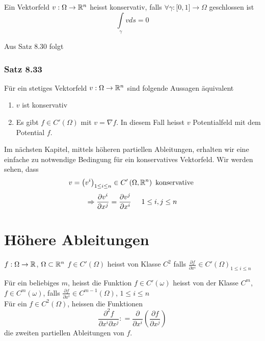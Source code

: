 \begin{definition}{8.32}
Ein Vektorfeld $v:\Omega\to\mathbb{R}^n$ heisst konservativ, falls $\forall\gamma:\lbrack 0,1\rbrack\to\Omega$ geschlossen ist \[\int\limits_\gamma v ds=0\]
\end{definition}
Aus Satz 8.30 folgt
\subsubsection*{Satz 8.33}
Für ein stetiges Vektorfeld $v:\Omega\to\mathbb{R}^n$ sind folgende Aussagen äquivalent
\begin{enumerate}
\item $v$ ist konservativ
\item Es gibt $f\in C'\left( \Omega\right)$ mit $v=\nabla f$. In diesem Fall heisst $v$ Potentialfeld mit dem Potential $f$.
\end{enumerate}

Im nächsten Kapitel, mittels höheren partiellen Ableitungen, erhalten wir eine einfache zu  notwendige Bedingung für ein konservatives Vektorfeld. Wir werden sehen, dass
\[v = {\left( {{v^i}} \right)_{1 \le i \le n}} \in C'\left( {\Omega ,\mathbb{R}^n} \right)\text{ konservative }\]
\[\Rightarrow \frac{\partial v^i}{\partial x^j}=\frac{\partial v^j}{\partial x^i}\hspace{5mm}1\leq i,j\leq n\]

\section{Höhere Ableitungen}
\begin{definition}{8.44}
$f:\Omega\to\mathbb{R}$, $\Omega\subset\mathbb{R}^n$ $f\in C'\left( \Omega\right)$ heisst von Klasse $C^2$ falls $\frac{\partial f}{\partial x^i}\in C'{\left( \Omega\right)}_{1\leq i\leq n}$
\end{definition}
Für ein beliebiges $m$, heisst die Funktion $f\in C'\left( \omega\right)$ heisst von der Klasse $C^m$, $f\in C^m\left( \omega\right)$, falls $\frac{\partial f}{\partial x^i}\in C^{m-1}\left( \Omega\right)$, $1\leq i\leq n$\\

Für ein $f\in C^2\left( \Omega\right)$, heissen die Funktionen \[\frac{{{\partial ^2}f}}{{\partial {x^i}\partial {x^j}}}: = \frac{\partial }{{\partial {x^i}}}\left( {\frac{{\partial f}}{{\partial {x^j}}}} \right)\] die zweiten partiellen Ableitungen von $f$.\\

